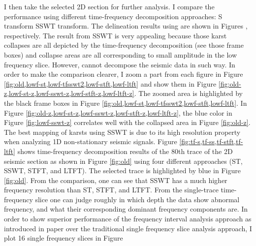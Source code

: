 


I then take the selected 2D section for further analysis. I compare the performance using  different time-frequency decomposition approaches:  S transform SSWT transform.  The delineation results using  are shown in Figures , respectively. The result from SSWT is very appealing because those karst collapses are all depicted by the time-frequency decomposition (see those  frame boxes)\new{,} and  collapse areas are all corresponding to small amplitude in the low frequency slice. However,  cannot decompose the seismic data in such way.  In order to make the comparison clearer, I zoom a part from each figure in Figure \ref{fig:old,lowf-st,lowf-tfsswt2,lowf-stft,lowf-ltft} and show them in Figure \ref{fig:old-z,lowf-st-z,lowf-sswt-z,lowf-stft-z,lowf-ltft-z}. The zoomed area is highlighted by the black frame boxes in Figure \ref{fig:old,lowf-st,lowf-tfsswt2,lowf-stft,lowf-ltft}. In Figure \ref{fig:old-z,lowf-st-z,lowf-sswt-z,lowf-stft-z,lowf-ltft-z}, the blue color in Figure \ref{fig:lowf-sswt-z} correlates well with the collapsed area in Figure \ref{fig:old-z}. The best mapping of karsts using SSWT is due to its high resolution property when analyzing 1D non-stationary seismic signals. Figure \ref{fig:tf-s,tf-ss,tf-stft,tf-ltft} shows time-frequency decomposition results of the 80th trace of the 2D seismic section as shown in Figure \ref{fig:old}\new{,} using four different approaches (ST, SSWT, STFT, and LTFT). The selected trace is highlighted by blue in Figure \ref{fig:old}.  From the comparison, one can see that SSWT has a much higher frequency resolution than ST, STFT, and LTFT. From the single-trace time-frequency slice one can judge roughly in which depth the data show abnormal frequency, and what their corresponding dominant frequency components are. In order to show superior performance of the frequency interval analysis approach as introduced in  paper\new{,} over the traditional single frequency slice analysis approach, I plot 16 single frequency slices in Figure 